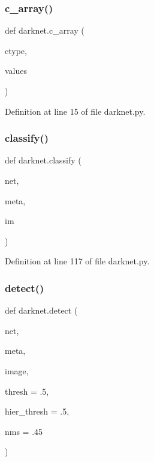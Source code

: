 \subsubsection{\texorpdfstring{c\_array()}{c\_array()}}
{\footnotesize\ttfamily def darknet.\+c\+\_\+array (\begin{DoxyParamCaption}\item[{}]{ctype,  }\item[{}]{values }\end{DoxyParamCaption})}



Definition at line 15 of file darknet.\+py.

\mbox{\label{namespacedarknet_a6f04d83a940049bd6ec10ab0ce9480eb}} 
\subsubsection{\texorpdfstring{classify()}{classify()}}
{\footnotesize\ttfamily def darknet.\+classify (\begin{DoxyParamCaption}\item[{}]{net,  }\item[{}]{meta,  }\item[{}]{im }\end{DoxyParamCaption})}



Definition at line 117 of file darknet.\+py.

\mbox{\label{namespacedarknet_a7d3eaf0113e0b328013aa81edaad9f91}} 
\subsubsection{\texorpdfstring{detect()}{detect()}}
{\footnotesize\ttfamily def darknet.\+detect (\begin{DoxyParamCaption}\item[{}]{net,  }\item[{}]{meta,  }\item[{}]{image,  }\item[{}]{thresh = {\ttfamily .5},  }\item[{}]{hier\+\_\+thresh = {\ttfamily .5},  }\item[{}]{nms = {\ttfamily .45} }\end{DoxyParamCaption})}



